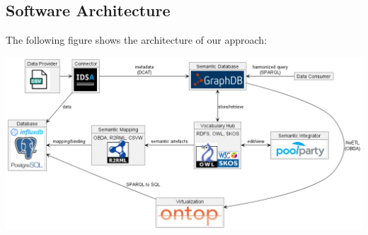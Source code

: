 \documentclass[manuscript,screen]{acmart}
\begin{document}
\subsection{Software Architecture}\label{software-architecture}

The following figure shows the architecture of our approach:

\includegraphics{img/architecture.png}
\end{document}
